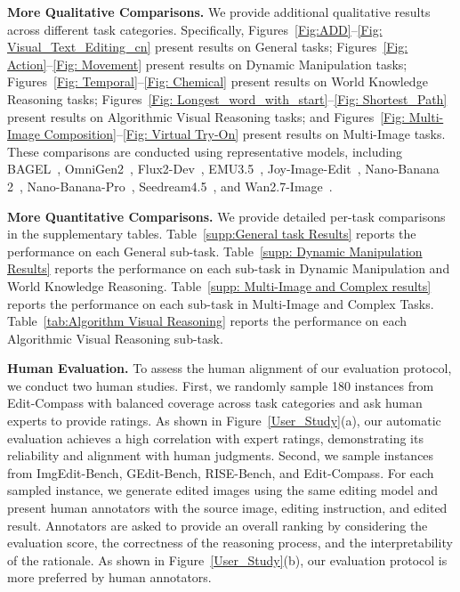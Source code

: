 \documentclass{llmxive}
\providecommand{\bench}{Edit-Compass}
\begin{document}
\textbf{More Qualitative Comparisons.}
We provide additional qualitative results across different task categories. Specifically, Figures~\ref{Fig:ADD}--\ref{Fig: Visual_Text_Editing_cn} present results on General tasks; Figures~\ref{Fig: Action}--\ref{Fig: Movement} present results on Dynamic Manipulation tasks; Figures~\ref{Fig: Temporal}--\ref{Fig: Chemical} present results on World Knowledge Reasoning tasks; Figures~\ref{Fig: Longest_word_with_start}--\ref{Fig: Shortest_Path} present results on Algorithmic Visual Reasoning tasks; and Figures~\ref{Fig: Multi-Image Composition}--\ref{Fig: Virtual Try-On} present results on Multi-Image tasks. These comparisons are conducted using representative models, including BAGEL~\cite{zhao2025envisioning}, OmniGen2~\cite{wu2025omnigen2}, Flux2-Dev~\cite{flux-2-2025}, EMU3.5~\cite{cui2025emu3}, Joy-Image-Edit~\cite{joyaiimage2026}, Nano-Banana 2~\cite{google2026gemini31flashimagepreview}, Nano-Banana-Pro~\cite{nanobananapro}, Seedream4.5~\cite{seedream2025seedream}, and Wan2.7-Image~\cite{wan}.

\textbf{More Quantitative Comparisons.}
We provide detailed per-task comparisons in the supplementary tables. Table~\ref{supp:General task Results} reports the performance on each General sub-task. Table~\ref{supp: Dynamic Manipulation Results} reports the performance on each sub-task in Dynamic Manipulation and World Knowledge Reasoning. Table~\ref{supp: Multi-Image and Complex results} reports the performance on each sub-task in Multi-Image and Complex Tasks. Table~\ref{tab:Algorithm Visual Reasoning} reports the performance on each Algorithmic Visual Reasoning sub-task.

\textbf{Human Evaluation.}
To assess the human alignment of our evaluation protocol, we conduct two human studies. First, we randomly sample 180 instances from {\bench} with balanced coverage across task categories and ask human experts to provide ratings. As shown in Figure~\ref{User_Study}(a), our automatic evaluation achieves a high correlation with expert ratings, demonstrating its reliability and alignment with human judgments.
Second, we sample instances from ImgEdit-Bench, GEdit-Bench, RISE-Bench, and {\bench}. For each sampled instance, we generate edited images using the same editing model and present human annotators with the source image, editing instruction, and edited result. Annotators are asked to provide an overall ranking by considering the evaluation score, the correctness of the reasoning process, and the interpretability of the rationale. As shown in Figure~\ref{User_Study}(b), our evaluation protocol is more preferred by human annotators.
\end{document}
